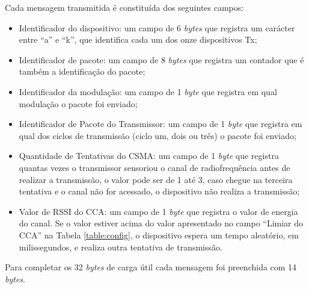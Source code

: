 Cada mensagem transmitida é constituída dos seguintes campos:
\begin{itemize}
      \label{table:estruturaTx}
      \item Identificador do dispositivo: um campo de 6 \emph{bytes} que registra um carácter entre ``a'' e ``k'', que identifica cada um dos onze dispositivos Tx;
      \item Identificador de pacote: um campo de 8 \emph{bytes} que registra um contador que é também a identificação do pacote;
      \item Identificador da modulação: um campo de 1 \emph{byte} que registra em qual modulação o pacote foi enviado;
      \item Identificador de Pacote do Transmissor: um campo de 1 \emph{byte} que registra em qual dos ciclos de transmissão (ciclo um, dois ou três) o pacote foi enviado;
      \item Quantidade de Tentativas do CSMA: um campo de 1 \emph{byte} que registra quantas vezes o transmissor sensoriou o canal de radiofrequência antes de realizar a transmissão, o valor pode ser de 1 até 3, caso chegue na terceira tentativa e o canal não for acessado, o dispositivo não realiza a transmissão;
      \item Valor de RSSI do CCA: um campo de 1 \emph{byte} que registra o valor de energia do canal. Se o valor estiver acima do valor apresentado no campo ``Limiar do CCA'' na Tabela \ref{table:config}, o dispositivo espera um tempo aleatório, em milissegundos, e realiza outra tentativa de transmissão.
\end{itemize}

Para completar os 32 \emph{bytes} de carga útil cada mensagem foi preenchida com 14 \emph{bytes}.

